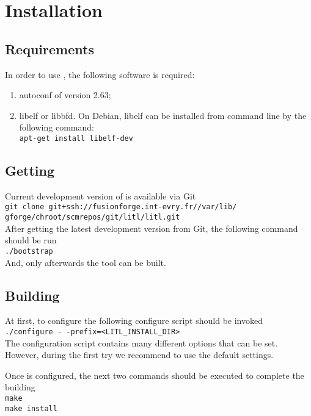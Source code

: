 \chapter{Installation}
\section{Requirements}
In order to use \litl{}, the following software is required:
\begin{enumerate}
 \item autoconf of version 2.63;
 
 \item libelf or libbfd. On Debian, libelf can be installed from command line by 
       the following command:\\
       \texttt{apt-get install libelf-dev}
\end{enumerate}

\section{Getting \litl}
Current development version of \litl{} is available via Git\\
    \hspace*{0.9cm}\texttt{git clone git+ssh://fusionforge.int-evry.fr//var/lib/}\\
    \hspace*{0.9cm}\texttt{gforge/chroot/scmrepos/git/litl/litl.git}\\
After getting the latest development version from Git, the following command 
should be run\\
\hspace*{0.9cm}\texttt{./bootstrap}\\ 
And, only afterwards the tool can be built.

\section{Building \eztrace{}}
At first, to configure \litl{} the following configure script should be 
invoked\\
    \hspace*{0.9cm}\texttt{./configure -\,-prefix=<LITL\_INSTALL\_DIR>}\\
The configuration script contains many different options that can be set. 
However, during the first try we recommend to use the default settings.

Once \litl{} is configured, the next two commands should be executed to complete  
the building\\
    \hspace*{0.9cm}\texttt{make}\\
    \hspace*{0.9cm}\texttt{make install}

